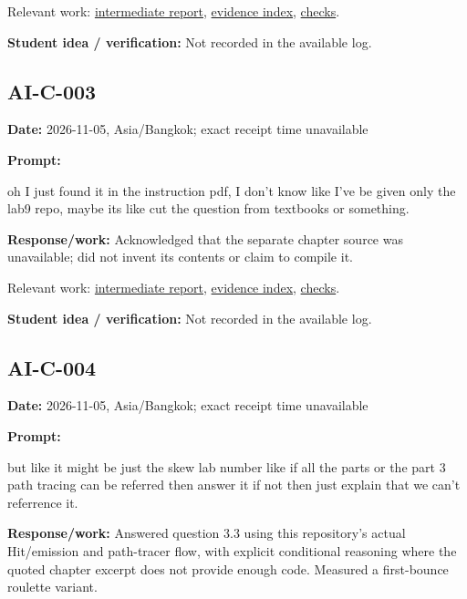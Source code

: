\documentclass[11pt,a4paper]{article}
\begin{document}
Relevant work: \href{https://github.com/Champy2005/Lab09-RayTracing/blob/main/docs/report/intermediate-report.md}{intermediate report}, \href{https://github.com/Champy2005/Lab09-RayTracing/blob/main/evidence/README.md}{evidence index}, \href{https://github.com/Champy2005/Lab09-RayTracing/blob/main/evidence/terminal/verification.txt}{checks}.\par
\noindent\textbf{Student idea / verification:} Not recorded in the available log.\par\medskip
{}\subsection*{AI-C-003}
\noindent\textbf{Date:} 2026-11-05, Asia/\allowbreak{}Bangkok; exact receipt time unavailable\par
\noindent\textbf{Prompt:}
\begin{prompt}
oh I just found it in the instruction pdf, I don't know like I've be given only the lab9
repo, maybe its like cut the question from textbooks or something.
\end{prompt}
\noindent\textbf{Response/work:} Acknowledged that the separate chapter source was unavailable; did not invent its contents or claim to compile it.

Relevant work: \href{https://github.com/Champy2005/Lab09-RayTracing/blob/main/docs/report/intermediate-report.md}{intermediate report}, \href{https://github.com/Champy2005/Lab09-RayTracing/blob/main/evidence/README.md}{evidence index}, \href{https://github.com/Champy2005/Lab09-RayTracing/blob/main/evidence/terminal/verification.txt}{checks}.\par
\noindent\textbf{Student idea / verification:} Not recorded in the available log.\par\medskip
{}\subsection*{AI-C-004}
\noindent\textbf{Date:} 2026-11-05, Asia/\allowbreak{}Bangkok; exact receipt time unavailable\par
\noindent\textbf{Prompt:}
\begin{prompt}
but like it might be just the skew lab number like if all the parts or the part 3 path
tracing  can be referred then answer it if not then just explain that we can't referrence
 it.
\end{prompt}
\noindent\textbf{Response/work:} Answered question 3.3 using this repository's actual Hit/\allowbreak{}emission and path-tracer flow, with explicit conditional reasoning where the quoted chapter excerpt does not provide enough code. Measured a first-bounce roulette variant.
\end{document}
